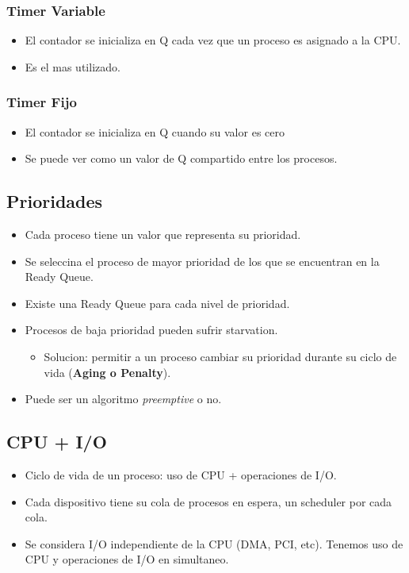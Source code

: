 \documentclass[11pt]{article}
\begin{document}
\subsubsection{Timer Variable}
\begin{itemize}
    \item El contador se inicializa en Q cada vez que un proceso es asignado a la CPU.
    \item Es el mas utilizado.
\end{itemize}

\subsubsection{Timer Fijo}
\begin{itemize}
    \item El contador se inicializa en Q cuando su valor es cero
    \item Se puede ver como un valor de Q compartido entre los procesos.
\end{itemize}

\subsection{Prioridades}
\begin{itemize}
    \item Cada proceso tiene un valor que representa su prioridad.
    \item Se seleccina el proceso de mayor prioridad de los que se encuentran en la Ready Queue.
    \item Existe una Ready Queue para cada nivel de prioridad.
    \item Procesos de baja prioridad pueden sufrir starvation.
        \begin{itemize}
            \item Solucion: permitir a un proceso cambiar su prioridad durante su ciclo de vida (\textbf{Aging o Penalty}).
        \end{itemize}
    \item Puede ser un algoritmo \textit{preemptive} o no.
\end{itemize}


\subsection{CPU + I/O}
\begin{itemize}
    \item Ciclo de vida de un proceso: uso de CPU + operaciones de I/O.
    \item Cada dispositivo tiene su cola de procesos en espera, un scheduler por cada cola.
    \item Se considera I/O independiente de la CPU (DMA, PCI, etc). Tenemos uso de CPU y operaciones de I/O en simultaneo.
\end{itemize}
\end{document}
